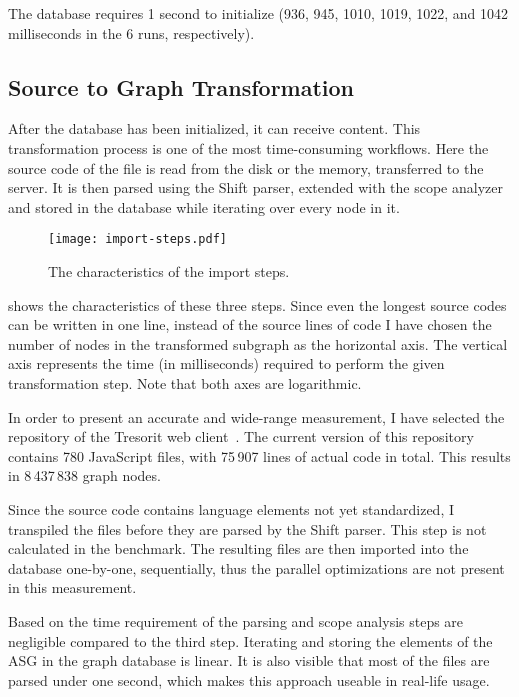 The database requires 1 second to initialize (936, 945, 1010, 1019, 1022, and 1042 milliseconds in the 6 runs, respectively).

\subsection{Source to Graph Transformation}
After the database has been initialized, it can receive content. This transformation process is one of the most time-consuming workflows. Here the source code of the file is read from the disk or the memory, transferred to the server. It is then parsed using the Shift parser, extended with the scope analyzer and stored in the database while iterating over every node in it.

\begin{figure}[!htb]
  \centering
  \texttt{[image: import-steps.pdf]}
  \caption{The characteristics of the import steps.}
  \label{fig:import-steps}
\end{figure}

 shows the characteristics of these three steps. Since even the longest source codes can be written in one line, instead of the source lines of code I have chosen the number of nodes in the transformed subgraph as the horizontal axis. The vertical axis represents the time (in milliseconds) required to perform the given transformation step. Note that both axes are logarithmic.

In order to present an accurate and wide-range measurement, I have selected the repository of the Tresorit web client~\cite{tresorit-webclient}. The current version of this repository contains 780 JavaScript files, with 75\,907 lines of actual code in total. This results in 8\,437\,838 graph nodes.

Since the source code contains language elements not yet standardized, I transpiled the files before they are parsed by the Shift parser. This step is not calculated in the benchmark. The resulting files are then imported into the database one-by-one, sequentially, thus the parallel optimizations are not present in this measurement.

Based on  the time requirement of the parsing and scope analysis steps are negligible compared to the third step. Iterating and storing the elements of the ASG in the graph database is linear. It is also visible that most of the files are parsed under one second, which makes this approach useable in real-life usage.

